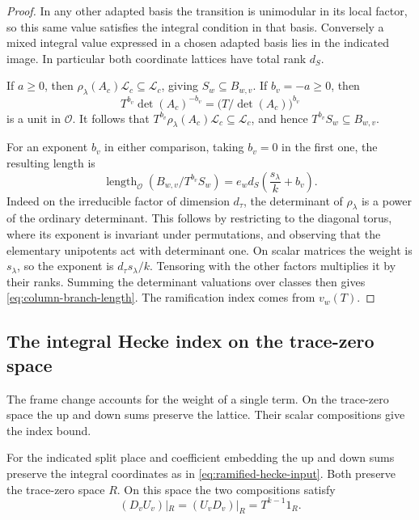 \begin{proof}
In any other adapted basis
the transition is unimodular in its local factor, so this
same value satisfies the integral condition in that basis.
Conversely a mixed integral value expressed in a chosen
adapted basis lies in the indicated image. In particular
both coordinate lattices have total rank \(d_S\).

If \(a\ge0\), then \(\rho_\lambda(A_c)\mathcal L_c\subseteq
\mathcal L_c\), giving \(S_w\subseteq B_{w,v}\).
If \(b_v=-a\ge0\), then
\[
 T^{b_v}\det(A_c)^{-b_v}
          =\bigl(T/\det(A_c)\bigr)^{b_v}
\]
is a unit in \(\mathcal O\). It follows that
\(T^{b_v}\rho_\lambda(A_c)\mathcal L_c\subseteq\mathcal L_c\),
and hence \(T^{b_v}S_w\subseteq B_{w,v}\).

For an exponent \(b_v\) in either comparison, taking
\(b_v=0\) in the first one, the resulting length is
\begin{equation}\label{eq:column-branch-length}
          \operatorname{length}_{\mathcal O}
                  (B_{w,v}/T^{b_v}S_w)
             = e_w d_S\left(\frac{s_\lambda}{k}+b_v\right).
\end{equation}
Indeed on the irreducible factor of dimension \(d_\tau\),
the determinant of \(\rho_\lambda\) is a power of the
ordinary determinant. This follows by restricting to
the diagonal torus, where its exponent is invariant
under permutations, and observing that the elementary
unipotents act with determinant one. On scalar matrices
the weight is \(s_\lambda\), so the exponent is
\(d_\tau s_\lambda/k\). Tensoring with the other factors
multiplies it by their ranks. Summing the determinant
valuations over classes then gives \eqref{eq:column-branch-length}.
The ramification index comes from \(v_w(T)\).

\end{proof}

\subsection{The integral Hecke index on the trace-zero space}
\label{sec:ramified-hecke-index}

The frame change accounts for the weight of a single term. On the trace-zero space the up and down sums preserve the lattice. Their scalar compositions give the index bound.

\begin{proposition}\label{prop:ramified-hecke-maps}
For the indicated split place and coefficient embedding the
up and down sums preserve the integral coordinates as in
\eqref{eq:ramified-hecke-input}. Both preserve the trace-zero space \(R\). On this space the two compositions satisfy
\[
 (D_vU_v)|_R=(U_vD_v)|_R=T^{k-1}1_R.
\]

\end{proposition}

